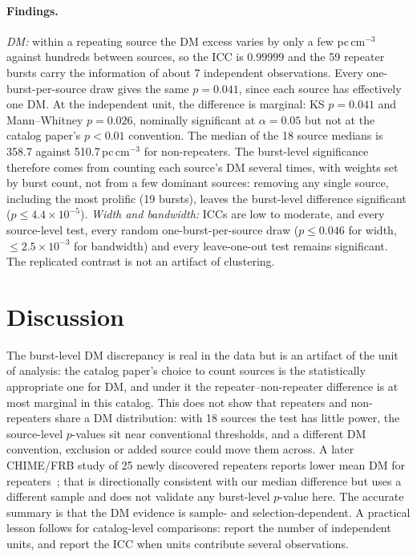 \documentclass[11pt]{article}
\begin{document}
\paragraph{Findings.}
\emph{DM:} within a repeating source the DM excess varies by only a few pc\,cm$^{-3}$ against hundreds between sources, so the
ICC is $0.99999$ and the 59 repeater bursts carry the information of about 7 independent observations. Every one-burst-per-source
draw gives the same $p=0.041$, since each source has effectively one DM. At the independent unit, the difference is marginal:
KS $p=0.041$ and Mann--Whitney $p=0.026$, nominally significant at $\alpha=0.05$ but not at the catalog paper's $p<0.01$
convention. The median of the 18 source medians is 358.7 against 510.7\,pc\,cm$^{-3}$ for non-repeaters. The burst-level
significance therefore comes from counting each source's DM several times, with weights set by burst count, not from a few
dominant sources: removing any single source, including the most prolific (19 bursts), leaves the burst-level difference
significant ($p\le4.4\times10^{-5}$). \emph{Width and bandwidth:} ICCs are low to moderate, and every source-level test, every
random one-burst-per-source draw ($p\le0.046$ for width, $\le2.5\times10^{-3}$ for bandwidth) and every leave-one-out
test remains significant. The replicated contrast is not an artifact of clustering.

\section{Discussion}
The burst-level DM discrepancy is real in the data but is an artifact of the unit of analysis: the catalog paper's choice to
count sources is the statistically appropriate one for DM, and under it the repeater--non-repeater difference is at most
marginal in this catalog. This does not show that repeaters and non-repeaters share a DM distribution: with 18 sources the
test has little power, the source-level $p$-values sit near conventional thresholds, and a different DM convention, exclusion
or added source could move them across. A later CHIME/FRB study of 25 newly discovered repeaters reports lower mean DM
for repeaters~\cite{chime2023}; that is directionally consistent with our median difference but uses a different sample and
does not validate any burst-level $p$-value here. The accurate summary is that the DM evidence is sample- and
selection-dependent. A practical lesson follows for catalog-level comparisons: report the number of independent units,
and report the ICC when units contribute several observations.
\end{document}
